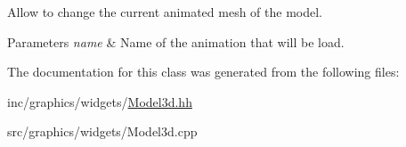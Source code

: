 Allow to change the current animated mesh of the model. 


\begin{DoxyParams}{Parameters}
{\em name} & Name of the animation that will be load. \\
\hline
\end{DoxyParams}


The documentation for this class was generated from the following files\+:\begin{DoxyCompactItemize}
\item 
inc/graphics/widgets/\hyperlink{Model3d_8hh}{Model3d.\+hh}\item 
src/graphics/widgets/Model3d.\+cpp\end{DoxyCompactItemize}
